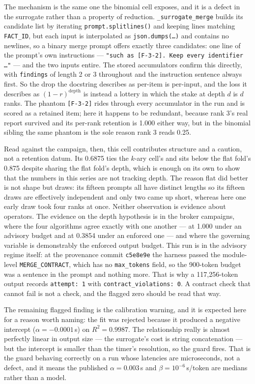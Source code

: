 \documentclass[11pt]{article}
\begin{document}
The mechanism is the same one the binomial cell exposes, and it is a defect in the surrogate
rather than a property of reduction. \texttt{\_surrogate\_merge} builds its candidate list
by iterating \texttt{prompt.splitlines()} and keeping lines matching \texttt{FACT\_ID}, but
each input is interpolated as \texttt{json.dumps(\dots)} and contains no newlines, so a
binary merge prompt offers exactly three candidates: one line of the prompt's own
instructions --- \texttt{"such as [F-3-2]. Keep every identifier \dots"} --- and the two
inputs entire. The stored accumulators confirm this directly, with \texttt{findings} of
length 2 or 3 throughout and the instruction sentence always first. So the drop the
docstring describes as per-item is per-input, and the loss it describes as
$(1-r)^{\text{depth}}$ is instead a lottery in which the stake at depth $d$ is $d$ ranks.
The phantom \texttt{[F-3-2]} rides through every accumulator in the run and is scored as a
retained item; here it happens to be redundant, because rank 3's real report survived and
its per-rank retention is 1.000 either way, but in the binomial sibling the same phantom is
the sole reason rank 3 reads 0.25.

Read against the campaign, then, this cell contributes structure and a caution, not a
retention datum. Its 0.6875 ties the $k$-ary cell's and sits below the flat fold's 0.875
despite sharing the flat fold's depth, which is enough on its own to show that the numbers
in this series are not tracking depth. The reason flat did better is not shape but draws:
its fifteen prompts all have distinct lengths so its fifteen draws are effectively
independent and only two came up short, whereas here one early draw took four ranks at
once. Neither observation is evidence about operators. The evidence on the depth hypothesis
is in the broker campaigns, where the four algorithms agree exactly with one another --- at
1.000 under an advisory budget and at 0.3854 under an enforced one --- and where the
governing variable is demonstrably the enforced output budget. This run is in the advisory
regime itself: at the provenance commit \texttt{c5e8e9e} the harness passed the module-level
\texttt{MERGE\_CONTRACT}, which has no \texttt{max\_tokens} field, so the 900-token budget
was a sentence in the prompt and nothing more. That is why a 117{,}256-token output records
\texttt{attempt: 1} with \texttt{contract\_violations: 0}. A contract check that cannot fail
is not a check, and the flagged zero should be read that way.

The remaining flagged finding is the calibration warning, and it is expected here for a
reason worth naming: the fit was rejected because it produced a negative intercept
($\alpha = -0.0001$\,s) on $R^2 = 0.9987$. The relationship really is almost perfectly
linear in output size --- the surrogate's cost is string concatenation --- but the intercept
is smaller than the timer's resolution, so the guard fires. That is the guard behaving
correctly on a run whose latencies are microseconds, not a defect, and it means the
published $\alpha = 0.003$\,s and $\beta = 10^{-6}$\,s/token are medians rather than a
model.
\end{document}

